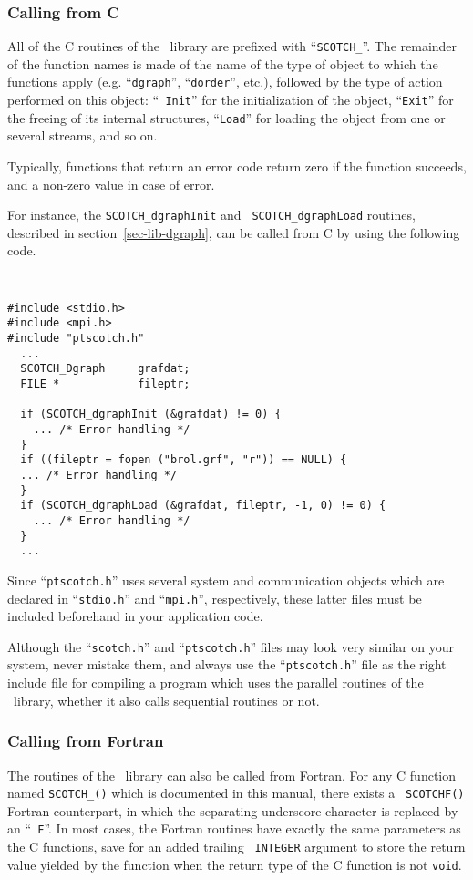 \subsubsection{Calling from C}

All of the C routines of the \libscotch\ library are prefixed with
``{\tt SCOTCH\_}''. The remainder of the function names is made of the
name of the type of object to which the functions apply (e\@.g\@.
``{\tt dgraph}'', ``{\tt dorder}'', etc.),
followed by the type of action performed on this object: ``{\tt
Init}'' for the initialization of the object, ``{\tt Exit}'' for the
freeing of its internal structures, ``{\tt Load}'' for loading the
object from one or several streams, and so on.

Typically, functions that return an error code return zero if the
function succeeds, and a non-zero value in case of error.

For instance, the {\tt SCOTCH\_\lbt dgraph\lbt Init} and {\tt
SCOTCH\_\lbt dgraph\lbt Load} routines, described in
section~\ref{sec-lib-dgraph}, can be called from C by using the
following code.
{\tt
\begin{verbatim}
#include <stdio.h>
#include <mpi.h>
#include "ptscotch.h"
  ...
  SCOTCH_Dgraph     grafdat;
  FILE *            fileptr;

  if (SCOTCH_dgraphInit (&grafdat) != 0) {
    ... /* Error handling */
  }
  if ((fileptr = fopen ("brol.grf", "r")) == NULL) {
  ... /* Error handling */
  }
  if (SCOTCH_dgraphLoad (&grafdat, fileptr, -1, 0) != 0) {
    ... /* Error handling */
  }
  ...
\end{verbatim}
}

Since ``{\tt ptscotch.h}'' uses several system and communication
objects which are declared in ``{\tt stdio.h}'' and ``{\tt mpi.h}'',
respectively, these latter files must be included beforehand
in your application code.

Although the ``{\tt scotch.h}'' and ``{\tt ptscotch.h}'' files may
look very similar on your system, never mistake them, and always use
the ``{\tt ptscotch.h}'' file as the right include file for compiling
a program which uses the parallel routines of the \libscotch\ library,
whether it also calls sequential routines or not.

\subsubsection{Calling from Fortran}

The routines of the \libscotch\ library can also be called from
Fortran. For any C function named {\tt SCOTCH\_()} which is documented in this manual, there exists a {\tt
SCOTCHF()} Fortran counterpart, in which
the separating underscore character is replaced by an ``{\tt
F}''. In most cases, the Fortran routines have exactly the same
parameters as the C functions, save for an added trailing {\tt
INTEGER} argument to store the return value yielded by the function
when the return type of the C function is not {\tt void}.
\\

